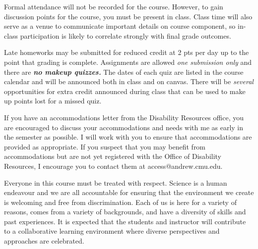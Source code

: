 \documentclass[11pt, a4paper]{article}
\begin{document}
\vspace{.4cm}

\noindent 
Formal attendance will not be recorded for the course. However, to gain
discussion points for the course, you must be present in class. Class time will
also serve as a venue to communicate important details on course component, so
in-class participation is likely to correlate strongly with final grade
outcomes.

Late homeworks may be submitted for reduced credit at 2 pts per day up to the
point that grading is complete. Assignments are allowed \emph{one submission
only} and there are \emph{\textbf{no makeup quizzes.}} The dates of each quiz
are listed in the course calendar and will be announced both in class and on
canvas. There will be \emph{several} opportunities for extra credit announced
during class that can be used to make up points lost for a missed quiz. 

\vspace{.4cm}

\noindent
If you have an accommodations letter from the Disability Resources office, you
are encouraged to discuss your accommodations and needs with me as early in the
semester as possible. I will work with you to ensure that accommodations are
provided as appropriate. If you suspect that you may benefit from accommodations
but are not yet registered with the Office of Disability Resources, I encourage
you to contact them at access@andrew.cmu.edu.
\vspace{.4cm}


\noindent 
Everyone in this course must be treated with respect. Science is a human
endeavour and we are all accountable for ensuring that the environment we create
is welcoming and free from discrimination. Each of us is here for a variety of
reasons, comes from a variety of backgrounds, and have a diversity of skills and
past experiences. It is expected that the students and instructor will
contribute to a collaborative learning environment where diverse perspectives
and approaches are celebrated.
\end{document}
